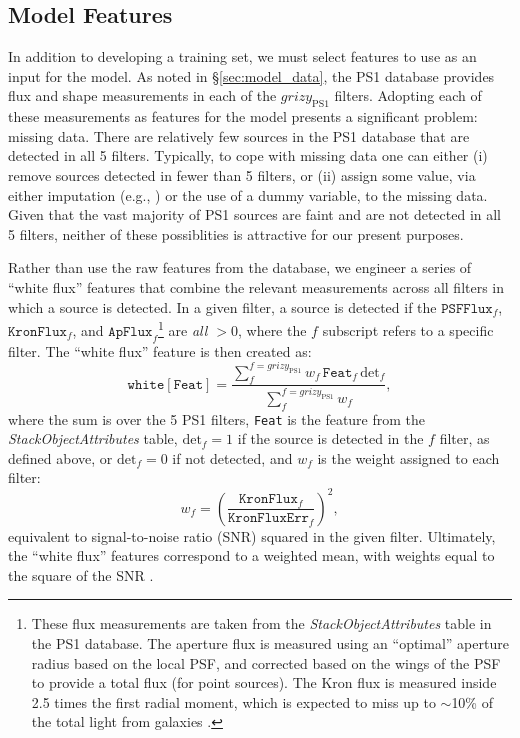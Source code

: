 \documentclass[twocolumn]{aastex62}
\begin{document}
\begin{CJK*}{UTF8}{gbsn}
\section{Model Features}\label{sec:model_features}

In addition to developing a training set, we must select features to use as
an input for the model. As noted in \S\ref{sec:model_data}, the PS1 database
provides flux and shape measurements in each of the $grizy_\mathrm{PS1}$
filters. Adopting each of these measurements as features for the model
presents a significant problem: missing data. There are relatively few
sources in the PS1 database that are detected in all 5 filters. Typically,
to cope with missing data one can either (i) remove sources detected in
fewer than 5 filters, or (ii) assign some value, via either imputation
(e.g., \citealt{Miller17}) or the use of a dummy variable, to the missing
data. Given that the vast majority of PS1 sources are faint and are not
detected in all 5 filters, neither of these possiblities is attractive for
our present purposes.

Rather than use the raw features from the database, we engineer a series of ``white flux'' features that combine the relevant measurements across all filters in which a source is detected. In a given filter, a source is detected if the $\mathtt{PSFFlux}_f$, $\mathtt{KronFlux}_f$, 
and $\mathtt{ApFlux}_f$\footnote{These flux measurements are taken from the \textit{StackObjectAttributes} table in the PS1 database. The aperture flux is measured using an ``optimal'' aperture radius based on the local PSF, and corrected based on the wings of the PSF to provide a total flux (for point sources). The Kron flux is measured inside 2.5 times the first radial moment, which is expected to miss up to $\sim$10\% of the total light from galaxies \citep{Magnier16b}.} 
are \textit{all $> 0$}, where the $f$ subscript refers to a specific filter. The ``white flux'' feature is then created as:
%
\begin{equation}
    \mathtt{white[Feat]} =  \frac{\sum_f^{f = grizy_\mathrm{PS1}} w_f  \, \mathtt{Feat}_f \, \mathrm{det}_f}{\sum_f^{f = grizy_\mathrm{PS1}} w_f}, 
\end{equation}
%
where the sum is over the 5 PS1 filters, \texttt{Feat} is the feature from the \textit{StackObjectAttributes} table, $\mathrm{det}_f = 1$ if the source is detected in the $f$ filter, as defined above, or $\mathrm{det}_f = 0$ if not detected, and $w_f$ is the weight assigned to each filter:
%
\begin{equation}
    w_f = \left(\frac{\mathtt{KronFlux}_f}{\mathtt{KronFluxErr}_f}\right)^2,
\end{equation}
%
equivalent to signal-to-noise ratio (SNR) squared in the given filter. 
Ultimately, the ``white flux'' features correspond to a weighted mean, with weights equal to the square of the SNR \citep{Bevington03}. 


\end{CJK*}
\end{document}
